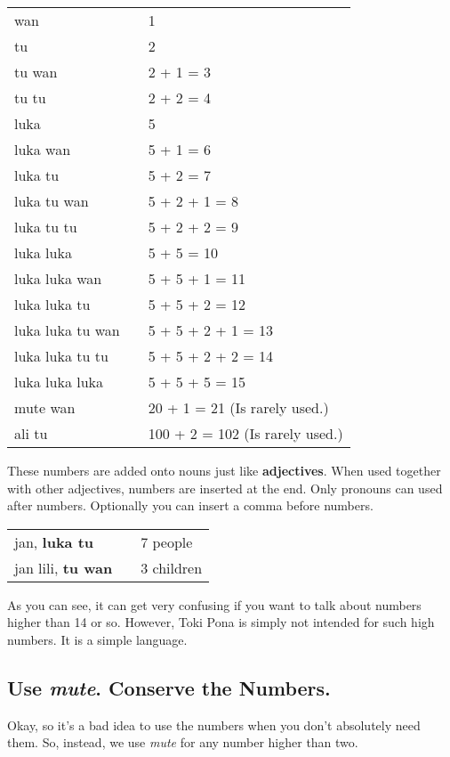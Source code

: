 \begin{supertabular}{p{5,5cm}|ll}
wan && 1 \\ 
tu  && 2 \\ 
tu wan && 2 + 1 = 3 \\
tu tu && 2 + 2 = 4 \\
luka && 5 \\
luka wan && 5 + 1 = 6 \\
luka tu && 5 + 2 = 7 \\
luka tu wan && 5 + 2 + 1 = 8 \\
luka tu tu && 5 + 2 + 2 = 9 \\
luka luka && 5 + 5 = 10 \\
luka luka wan && 5 + 5 + 1 = 11 \\
luka luka tu && 5 + 5 + 2 = 12 \\
luka luka tu wan && 5 + 5 + 2 + 1 = 13 \\
luka luka tu tu && 5 + 5 + 2 + 2 = 14 \\
luka luka luka && 5 + 5 + 5 = 15 \\
mute wan && 20 + 1 = 21 (Is rarely used.) \\
ali tu && 100 + 2 = 102 (Is rarely used.) \\
\end{supertabular} 

These numbers are added onto nouns just like \textbf{adjectives}. 
When used together with other adjectives, numbers are inserted at the end.
Only pronouns can used after numbers.
Optionally you can insert a comma before numbers. 

\begin{supertabular}{p{5,5cm}|ll}
jan, \textbf{luka tu} && 7 people \\
jan lili, \textbf{tu wan} && 3 children \\
\end{supertabular} 

As you can see, it can get very confusing if you want to talk about numbers higher than 14 or so.
However, Toki Pona is simply not intended for such high numbers. 
It is a simple language. 
%
\newpage
{}
\subsection*{Use \textit{mute}. Conserve the Numbers.}
%
Okay, so it's a bad idea to use the numbers when you don't absolutely need them. 
So, instead, we use \textit{mute} for any number higher than two.

